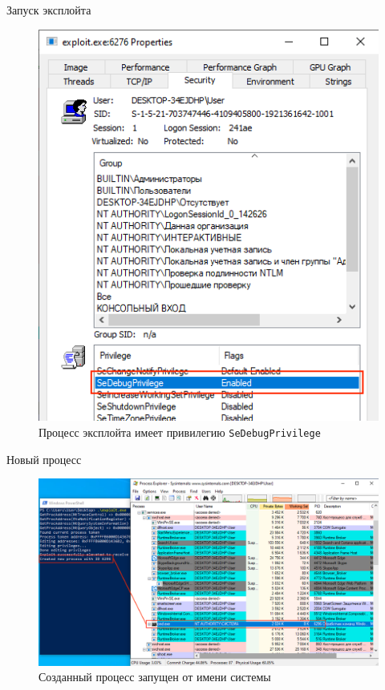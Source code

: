 \documentclass{beamer}
\begin{document}
\begin{frame}{Запуск эксплойта}
    
    \begin{figure}[h]
        \centering
        \includegraphics[scale=0.4]{elevated-privileges}
        \caption{Процесс эксплойта имеет привилегию \texttt{SeDebugPrivilege}}
    \end{figure}
    
\end{frame}

\begin{frame}{Новый процесс}
    
    \begin{figure}[h]
        \centering
        \includegraphics[scale=0.35]{working}
        \caption{Созданный процесс запущен от имени системы}
    \end{figure}
    
\end{frame}
\end{document}
